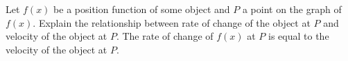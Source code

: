 {Let $f(x)$ be a position function of some object and $P$ a point on the graph of $f(x)$.  Explain the relationship between rate of change of the object at $P$ and velocity of the object at $P$.}
{The rate of change of $f(x)$ at $P$ is equal to the velocity of the object at $P$.}